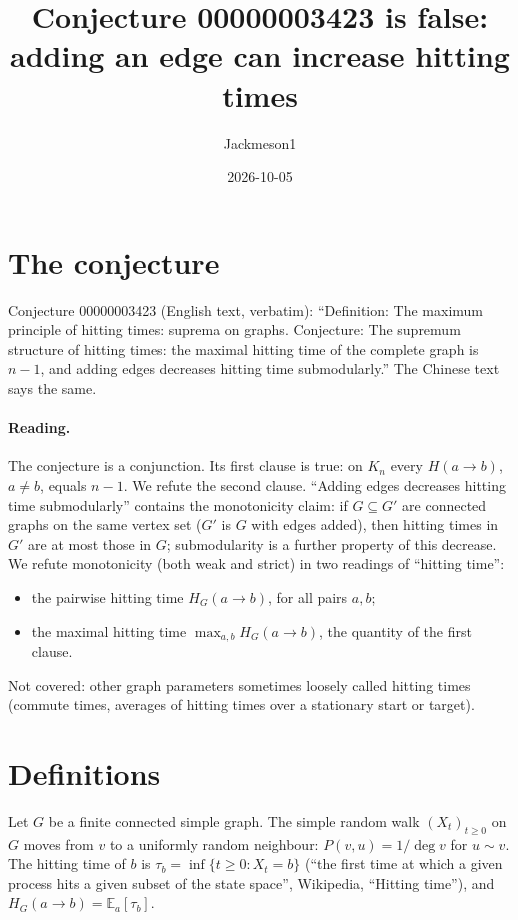 \documentclass[11pt]{article}
\title{Conjecture 00000003423 is false:\\ adding an edge can increase hitting times}
\author{Jackmeson1}
\date{2026-10-05}
\theoremstyle{definition}
\begin{document}
\maketitle

\section{The conjecture}
Conjecture 00000003423 (English text, verbatim): ``Definition: The maximum principle of hitting
times: suprema on graphs. Conjecture: The supremum structure of hitting times: the maximal hitting
time of the complete graph is $n-1$, and adding edges decreases hitting time submodularly.'' The
Chinese text says the same.

\paragraph{Reading.} The conjecture is a conjunction. Its first clause is true: on $K_n$ every
$H(a\to b)$, $a\ne b$, equals $n-1$. We refute the second clause. ``Adding edges decreases hitting
time submodularly'' contains the monotonicity claim: if $G\subseteq G'$ are connected graphs on
the same vertex set ($G'$ is $G$ with edges added), then hitting times in $G'$ are at most those in
$G$; submodularity is a further property of this decrease. We refute monotonicity (both weak and
strict) in two readings of ``hitting time'':
\begin{itemize}
\item[(R1)] the pairwise hitting time $H_G(a\to b)$, for all pairs $a,b$;
\item[(R2)] the maximal hitting time $\max_{a,b}H_G(a\to b)$, the quantity of the first clause.
\end{itemize}
Not covered: other graph parameters sometimes loosely called hitting times (commute times,
averages of hitting times over a stationary start or target).

\section{Definitions}
Let $G$ be a finite connected simple graph. The simple random walk $(X_t)_{t\ge0}$ on $G$ moves
from $v$ to a uniformly random neighbour: $P(v,u)=1/\deg v$ for $u\sim v$. The hitting time of $b$
is $\tau_b=\inf\{t\ge0: X_t=b\}$ (``the first time at which a given process hits a given subset of
the state space'', Wikipedia, ``Hitting time''), and $H_G(a\to b)=\mathbb E_a[\tau_b]$.
\end{document}
